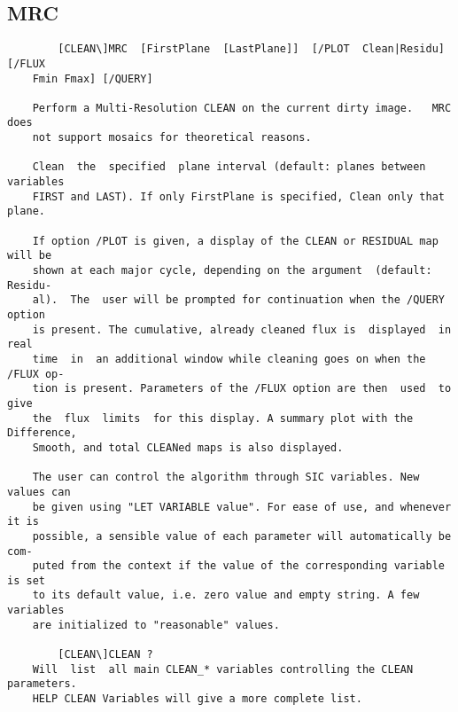 \subsection{MRC}
\begin{verbatim}
        [CLEAN\]MRC  [FirstPlane  [LastPlane]]  [/PLOT  Clean|Residu] [/FLUX
    Fmin Fmax] [/QUERY]

    Perform a Multi-Resolution CLEAN on the current dirty image.   MRC  does
    not support mosaics for theoretical reasons.

    Clean  the  specified  plane interval (default: planes between variables
    FIRST and LAST). If only FirstPlane is specified, Clean only that plane.

    If option /PLOT is given, a display of the CLEAN or RESIDUAL map will be
    shown at each major cycle, depending on the argument  (default:  Residu-
    al).  The  user will be prompted for continuation when the /QUERY option
    is present. The cumulative, already cleaned flux is  displayed  in  real
    time  in  an additional window while cleaning goes on when the /FLUX op-
    tion is present. Parameters of the /FLUX option are then  used  to  give
    the  flux  limits  for this display. A summary plot with the Difference,
    Smooth, and total CLEANed maps is also displayed.

    The user can control the algorithm through SIC variables. New values can
    be given using "LET VARIABLE value". For ease of use, and whenever it is
    possible, a sensible value of each parameter will automatically be  com-
    puted from the context if the value of the corresponding variable is set
    to its default value, i.e. zero value and empty string. A few  variables
    are initialized to "reasonable" values.

        [CLEAN\]CLEAN ?
    Will  list  all main CLEAN_* variables controlling the CLEAN parameters.
    HELP CLEAN Variables will give a more complete list.

\end{verbatim}
